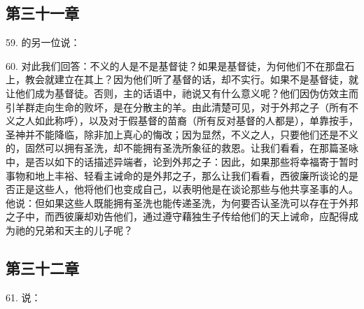 \subsection{第三十一章}

59. 的另一位说：\par

60. 对此我们回答：不义的人是不是基督徒？如果是基督徒，为何他们不在那盘石上，教会就建立在其上？因为他们听了基督的话，却不实行。如果不是基督徒，就让他们成为基督徒。否则，主的话语中，祂说又有什么意义呢？他们因伪仿效主而引羊群走向生命的败坏，是在分散主的羊。由此清楚可见，对于外邦之子（所有不义之人如此称呼），以及对于假基督的苗裔（所有反对基督的人都是），单靠按手，圣神并不能降临，除非加上真心的悔改；因为显然，不义之人，只要他们还是不义的，固然可以拥有圣洗，却不能拥有圣洗所象征的救恩。让我们看看，在那篇圣咏中，是否以如下的话描述异端者，论到外邦之子：因此，如果那些将幸福寄于暂时事物和地上丰裕、轻看主诫命的是外邦之子，那么让我们看看，西彼廉所谈论的是否正是这些人，他将他们也变成自己，以表明他是在谈论那些与他共享圣事的人。他说：但如果这些人既能拥有圣洗也能传递圣洗，为何要否认圣洗可以存在于外邦之子中，而西彼廉却劝告他们，通过遵守藉独生子传给他们的天上诫命，应配得成为祂的兄弟和天主的儿子呢？\par


\subsection{第三十二章}

61. 说：\par


